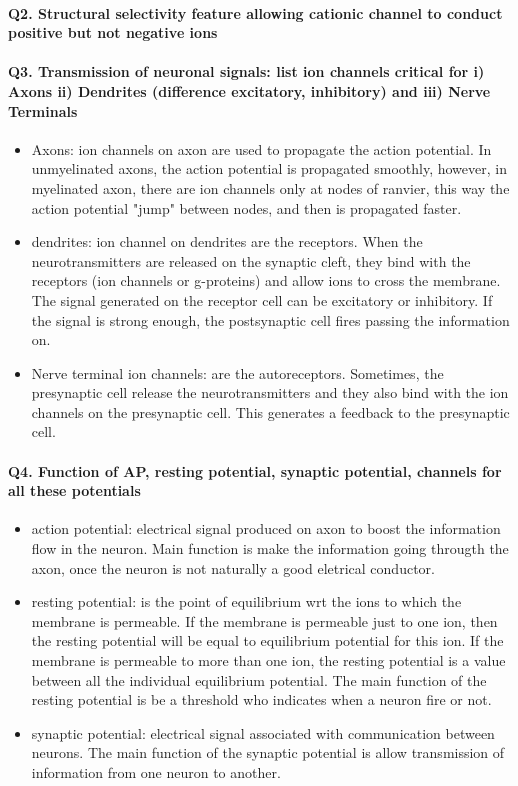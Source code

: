 \documentclass[12pt,article,oneside,a4paper]{memoir}
\begin{document}
\paragraph{Q2. Structural selectivity feature allowing cationic channel to conduct positive but not negative ions}



\paragraph{Q3. Transmission of neuronal signals: list ion channels critical for i) Axons ii) Dendrites (difference excitatory, inhibitory) and iii) Nerve Terminals}

\begin{itemize}
\item Axons: ion channels on axon are used to propagate the action potential. In unmyelinated axons, the action potential is propagated smoothly, however, in myelinated axon, there are ion channels only at nodes of ranvier, this way the action potential "jump" between nodes, and then is propagated faster.
\item dendrites: ion channel on dendrites are the receptors. When the neurotransmitters are released on the synaptic cleft, they bind with the receptors (ion channels or g-proteins) and allow ions to cross the membrane. The signal generated on the receptor cell can be excitatory or inhibitory. If the signal is strong enough, the postsynaptic cell fires passing the information on.
\item Nerve terminal ion channels: are the autoreceptors. Sometimes, the presynaptic cell release the neurotransmitters and they also bind with the ion channels on the presynaptic cell. This generates a feedback to the presynaptic cell.
\end{itemize}


\paragraph{Q4. Function of AP, resting potential, synaptic potential, channels for all these potentials}

\begin{itemize}
\item action potential: electrical signal produced on axon to boost the information flow in the neuron.	Main function is make the information going througth the axon, once the neuron is not naturally a good eletrical conductor.
\item resting potential: is the point of equilibrium wrt the ions to which the membrane is permeable. If the membrane is permeable just to one ion, then the resting potential will be equal to equilibrium potential for this ion. If the membrane is permeable to more than one ion, the resting potential is a value between all the individual equilibrium potential. The main function of the resting potential is be a threshold who indicates when a neuron fire or not.
\item synaptic potential: electrical signal associated with communication between neurons. The main function of the synaptic potential is allow transmission of information from one neuron to another.
\end{itemize}
\end{document}
